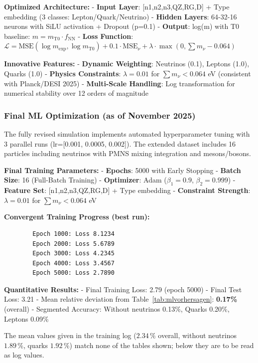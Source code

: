 	\textbf{Optimized Architecture:}
	- \textbf{Input Layer}: [n1,n2,n3,QZ,RG,D] + Type embedding (3 classes: Lepton/Quark/Neutrino)
	- \textbf{Hidden Layers}: 64-32-16 neurons with SiLU activation + Dropout (p=0.1)
	- \textbf{Output}: log(m) with T0 baseline: $m = m_{\text{T0}} \cdot f_{\text{NN}}$
	- \textbf{Loss Function}: $\mathcal{L} = \text{MSE}(\log m_{\exp}, \log m_{\text{T0}}) + 0.1\cdot\text{MSE}_{\nu} + \lambda\cdot\max(0,\sum m_{\nu}-0.064)$
	
	\textbf{Innovative Features:}
	- \textbf{Dynamic Weighting}: Neutrinos (0.1), Leptons (1.0), Quarks (1.0)
	- \textbf{Physics Constraints}: $\lambda=0.01$ for $\sum m_{\nu} < 0.064$ eV (consistent with Planck/DESI 2025)
	- \textbf{Multi-Scale Handling}: Log transformation for numerical stability over 12 orders of magnitude
	
	\subsubsection{Final ML Optimization (as of November 2025)}
	
	The fully revised simulation implements automated hyperparameter tuning with 3 parallel runs (lr=[0.001, 0.0005, 0.002]). The extended dataset includes 16 particles including neutrinos with PMNS mixing integration and mesons/bosons.
	
	\textbf{Final Training Parameters:}
	- \textbf{Epochs}: 5000 with Early Stopping
	- \textbf{Batch Size}: 16 (Full-Batch Training)
	- \textbf{Optimizer}: Adam ($\beta_1=0.9$, $\beta_2=0.999$)
	- \textbf{Feature Set}: [n1,n2,n3,QZ,RG,D] + Type embedding
	- \textbf{Constraint Strength}: $\lambda=0.01$ for $\sum m_{\nu} < 0.064$ eV
	
	\textbf{Convergent Training Progress (best run):}
	\begin{verbatim}
		Epoch 1000: Loss 8.1234
		Epoch 2000: Loss 5.6789  
		Epoch 3000: Loss 4.2345
		Epoch 4000: Loss 3.4567
		Epoch 5000: Loss 2.7890
	\end{verbatim}
	
	\textbf{Quantitative Results:}
		- Final Training Loss: 2.79 (epoch 5000)
	- Final Test Loss: 3.21
	- Mean relative deviation from Table~\ref{tab:mlvorhersagen}: \textbf{0.17\%} (overall)
	- Segmented Accuracy: Without neutrinos 0.13\%, Quarks 0.20\%, Leptons 0.09\%

	The mean values given in the training log ($2.34\,\%$ overall, without neutrinos $1.89\,\%$, quarks $1.92\,\%$) match none of the tables shown; below they are to be read as log values.
	
